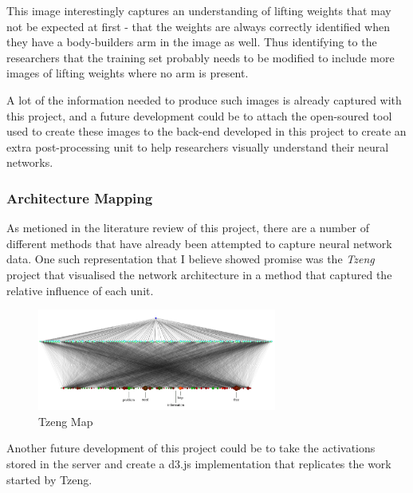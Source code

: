 \documentclass[a4paper,11pt,titlepage]{article}
\begin{document}
	This image interestingly captures an understanding of lifting weights that may not be expected at first - that the weights are always correctly identified when they have a body-builders arm in the image as well. Thus identifying to the researchers that the training set probably needs to be modified to include more images of lifting weights where no arm is present.
	\par 
	A lot of the information needed to produce such images is already captured with this project, and a future development could be to attach the open-soured tool used to create these images to the back-end developed in this project to create an extra post-processing unit to help researchers visually understand their neural networks.
	
	\subsubsection{Architecture Mapping}
	
	As metioned in the literature review of this project, there are a number of different methods that have already been attempted to capture neural network data. One such representation that I believe showed promise was the \textit{Tzeng} project that visualised the network architecture in a method that captured the relative influence of each unit.
	
	\begin{figure}[H]
		\centering 
    		\includegraphics[width=0.7\textwidth]{img/tzeng_large_map.png} 
    		\caption{Tzeng Map}%
 	\end{figure}
 	
	Another future development of this project could be to take the activations stored in the server and create a d3.js implementation that replicates the work started by Tzeng.
	
\end{document}
